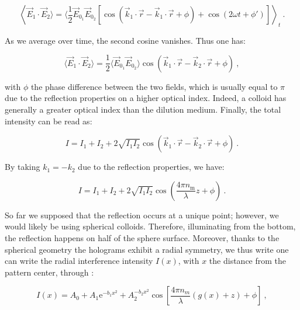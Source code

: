 \begin{equation}
	\left\langle  
	\vec{E}_1 \cdot \vec{E}_2 \rangle = 
	\langle
	\frac{1}{2} \vec{E}_{0_1}  \vec{E}_{0_2} 
	\left[
	\cos 
	\left(
	\vec{k}_1 \cdot \vec{r} - \vec{k}_1 \cdot \vec{r} + \phi 
	\right) 
	+ 
	\cos
	\left(
	2\omega t + \phi'
	\right)
	\right]
	\right\rangle_t~.
\end{equation}

As we average over time, the second cosine vanishes. Thus one has:

\begin{equation}
	\langle \vec{E}_1 \cdot \vec{E}_2 \rangle = \frac{1}{2} \langle  \vec{E}_{0_1}  \vec{E}_{0_2} \rangle
	\cos 
	\left(
	\vec{k}_1 \cdot \vec{r} - \vec{k}_2 \cdot \vec{r} + \phi 
	\right)  ~,
\end{equation}

with $\phi$ the phase difference between the two fields, which is usually equal to $\pi$ due to the reflection properties on a higher optical index. Indeed, a colloid has generally a greater optical index than the dilution medium.  Finally, the total intensity can be read as:


\begin{equation}
	I = I_1 + I_2 + 2 \sqrt{I_1 I_2} 
	\cos 
	\left(
	\vec{k}_1 \cdot \vec{r} - \vec{k}_2 \cdot \vec{r} + \phi 
	\right) ~.
\end{equation}

By taking $k_1 = - k_2$ due to the reflection properties, we have:


\begin{equation}
	I = I_1 + I_2 + 2 \sqrt{I_1 I_2} 
	\cos 
	\left(
	\frac{4 \pi n_{\mathrm{m}}}{\lambda} z + \phi 
	\right) ~.
\end{equation}


So far we supposed that the reflection occurs at a unique point; however, we would likely be using spherical colloids. Therefore, illuminating from the bottom, the reflection happens on half of the sphere surface. Moreover, thanks to the spherical geometry the holograms exhibit a radial symmetry, we thus write one can write the radial interference intensity $I(x)$, with $x$ the distance from the pattern center, through \cite{ raedler_measurement_1992}:


\begin{equation}
	I(x) = A_0 + A_1 \mathrm{e}^{-b_1 x^2} + A_2^{-b_2 x^2} \cos \left[ \frac{4\pi n_m}{\lambda}\left( g(x) + z \right) + \phi \right] ~,
	\label{Eq.RICM}
\end{equation}

